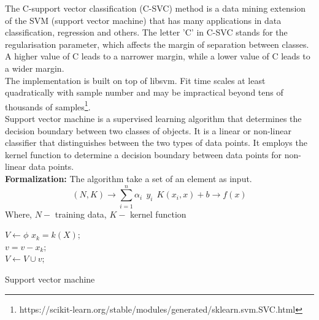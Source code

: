 \documentclass[conference]{IEEEtran}
\begin{document}
	The C-support vector classification (C-SVC) method is a data mining extension of the SVM (support vector machine) that has many applications in data classification, regression and others\cite{C18}. The letter 'C' in C-SVC stands for the regularisation parameter, which affects the margin of separation between classes. A higher value of C leads to a narrower margin, while a lower value of C leads to a wider margin\cite{C19}.\\
	The implementation is built on top of libsvm. Fit time scales at least quadratically with sample number and may be impractical beyond tens of thousands of samples\footnote{https://scikit-learn.org/stable/modules/generated/sklearn.svm.SVC.html}.\\	
	Support vector machine is a supervised learning algorithm that determines the decision boundary between two classes of objects. It is a linear or non-linear classifier that distinguishes between the two types of data points. It employs the kernel function to determine a decision boundary between data points for non-linear data points.\\
	\textbf{Formalization:} The algorithm take a set of an element as input.\\	
	\begin{equation*}
		(N, K) \rightarrow \sum_{i=1}^{n} \alpha_{i} \ \ y_{i} \ \ K(x_{i}, x) + b \rightarrow f(x)
	\end{equation*}
		Where, $N-$ training data, $K-$ kernel function
	\begin{algorithm}[!ht]
		\vspace{1em}
		
		\vspace{1em}
		
		{
			$V \leftarrow \phi$\;
			{
				$x_{k} = k(X);$\\
				$v= v - x_{k};$\\
				$V \leftarrow V \cup v;$\\
			}
		}
		\label{Support Vector Machine}
		\vspace{1em}
		\caption{Support vector machine}%
	\end{algorithm}
\end{document}
